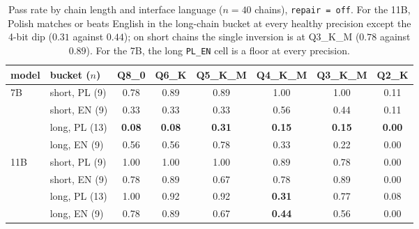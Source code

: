 \documentclass[11pt]{article}
\begin{document}
\begin{table}[h]
\centering
\caption{Pass rate by chain length and interface language ($n=40$ chains), \texttt{repair\,=\,off}. For the 11B, Polish matches or beats English in the long-chain bucket at every healthy precision except the 4-bit dip ($0.31$ against $0.44$); on short chains the single inversion is at Q3\_K\_M ($0.78$ against $0.89$). For the 7B, the long \texttt{PL\_EN} cell is a floor at every precision.}
\label{tab:lang}
\begin{tabular}{llcccccc}
\toprule
model & bucket ($n$) & Q8\_0 & Q6\_K & Q5\_K\_M & Q4\_K\_M & Q3\_K\_M & Q2\_K \\
\midrule
\multirow{4}{*}{7B}
 & short, PL (9)  & 0.78 & 0.89 & 0.89 & 1.00 & 1.00 & 0.11 \\
 & short, EN (9)  & 0.33 & 0.33 & 0.33 & 0.56 & 0.44 & 0.11 \\
 & long, PL (13)  & \textbf{0.08} & \textbf{0.08} & \textbf{0.31} & \textbf{0.15} & \textbf{0.15} & \textbf{0.00} \\
 & long, EN (9)   & 0.56 & 0.56 & 0.78 & 0.33 & 0.22 & 0.00 \\
\midrule
\multirow{4}{*}{11B}
 & short, PL (9)  & 1.00 & 1.00 & 1.00 & 0.89 & 0.78 & 0.00 \\
 & short, EN (9)  & 0.78 & 0.89 & 0.67 & 0.78 & 0.89 & 0.00 \\
 & long, PL (13)  & 1.00 & 0.92 & 0.92 & \textbf{0.31} & 0.77 & 0.08 \\
 & long, EN (9)   & 0.78 & 0.89 & 0.67 & \textbf{0.44} & 0.56 & 0.00 \\
\bottomrule
\end{tabular}
\end{table}
\end{document}
